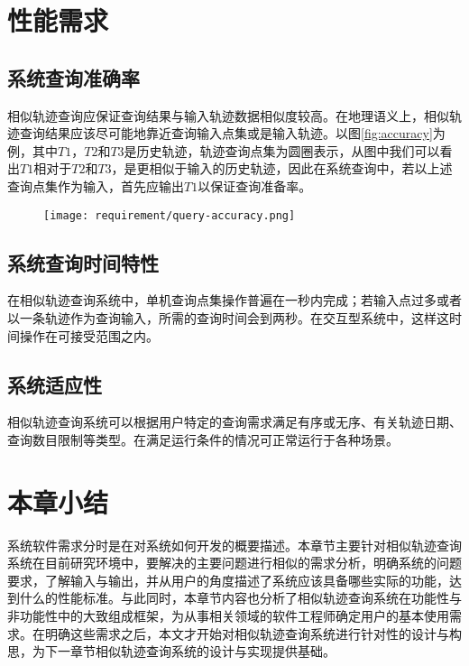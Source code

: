 
\vspace{3mm}

\begin{figure}[!htp]
    \centering
    \resizebox{!}{!}{}
\end{figure}

\section{性能需求}
\label{sec:performance requirements}

\subsection{系统查询准确率}
\label{subsec:performance accuracy}
相似轨迹查询应保证查询结果与输入轨迹数据相似度较高。在地理语义上，相似轨迹查询结果应该尽可能地靠近查询输入点集或是输入轨迹。以图\ref{fig:accuracy}为例，其中$T1$，$T2$和$T3$是历史轨迹，轨迹查询点集为圆圈表示，从图中我们可以看出$T1$相对于$T2$和$T3$，是更相似于输入的历史轨迹，因此在系统查询中，若以上述查询点集作为输入，首先应输出$T1$以保证查询准备率。

\begin{figure}[!htp]
  \centering
  \texttt{[image: requirement/query-accuracy.png]}
\end{figure}

\subsection{系统查询时间特性}
\label{subsec:performance time}
在相似轨迹查询系统中，单机查询点集操作普遍在一秒内完成；若输入点过多或者以一条轨迹作为查询输入，所需的查询时间会到两秒。在交互型系统中，这样这时间操作在可接受范围之内。

\subsection{系统适应性}
\label{subsec:performance flexibility}
相似轨迹查询系统可以根据用户特定的查询需求满足有序或无序、有关轨迹日期、查询数目限制等类型。在满足运行条件的情况可正常运行于各种场景。

\section{本章小结}
\label{sec:requirement conclusion}
系统软件需求分时是在对系统如何开发的概要描述。本章节主要针对相似轨迹查询系统在目前研究环境中，要解决的主要问题进行相似的需求分析，明确系统的问题要求，了解输入与输出，并从用户的角度描述了系统应该具备哪些实际的功能，达到什么的性能标准。与此同时，本章节内容也分析了相似轨迹查询系统在功能性与非功能性中的大致组成框架，为从事相关领域的软件工程师确定用户的基本使用需求。在明确这些需求之后，本文才开始对相似轨迹查询系统进行针对性的设计与构思，为下一章节相似轨迹查询系统的设计与实现提供基础。
